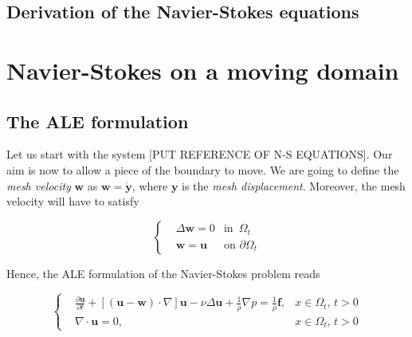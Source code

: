\documentclass[11pt,a4paper,titlepage]{report}
\begin{document}

\subsection{Derivation of the Navier-Stokes equations}


\section{Navier-Stokes on a moving domain}


\subsection{The ALE formulation}
Let us start with the system [PUT REFERENCE OF N-S EQUATIONS]. Our aim is now to allow a piece of the boundary to move. We are going to define the \textit{mesh velocity} $\mathbf{w}$ as $\mathbf{w} = \dot{\mathbf{y}}$, where $\mathbf{y}$ is the \textit{mesh displacement}. Moreover, the mesh velocity will have to satisfy 

\[
\left\{  
\begin{aligned}
& \Delta \mathbf{w} = 0 	& \text{in } \, \Omega_t \\
& \mathbf{w} = \mathbf{u} 				& \text{on } \partial \Omega_t
\end{aligned}
\right.
\]

Hence, the ALE formulation of the Navier-Stokes problem reads

\[
\left\{  
\begin{aligned}
&\frac{\partial \mathbf{u}}{\partial t} + [(\mathbf{u - w}) \cdot \nabla] \mathbf{u} - \nu \Delta \mathbf{u} + \frac{1}{\rho} \nabla p = \frac{1}{\rho} \mathbf{f},  & x \in \Omega_t, \, t>0 \\
& \nabla \cdot \mathbf{u} = 0, & x \in \Omega_t, \, t>0
\end{aligned}
\right.
\]
\end{document}
